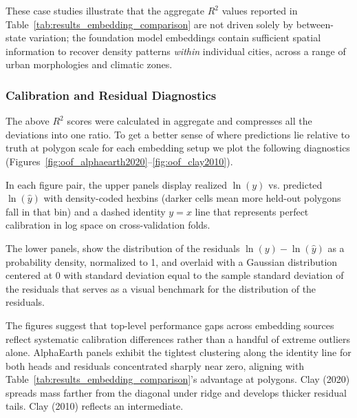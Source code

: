 \documentclass[12pt,letterpaper]{article}
\begin{document}
These case studies illustrate that the aggregate $R^2$ values reported in Table~\ref{tab:results_embedding_comparison} are not driven solely by between-state variation; the foundation model embeddings contain sufficient spatial information to recover density patterns \emph{within} individual cities, across a range of urban morphologies and climatic zones.

\subsubsection{Calibration and Residual Diagnostics}
\label{sub:calibration_diagnostics}

The above $R^2$ scores were calculated in aggregate and compresses all the deviations into one ratio. To get a better sense of where predictions lie relative to truth at polygon scale for each embedding setup we plot the following diagnostics (Figures~\ref{fig:oof_alphaearth2020}--\ref{fig:oof_clay2010}). 

In each figure pair, the upper panels display realized $\ln(y)$ vs. predicted $\ln(\hat{y})$ with density-coded hexbins (darker cells mean more held-out polygons fall in that bin) and a dashed identity $y=x$ line that represents perfect calibration in log space on cross-validation folds. 

The lower panels, show the distribution of the residuals $\ln(y) - \ln(\hat{y})$ as a probability density, normalized to 1, and overlaid with a Gaussian distribution centered at 0 with standard deviation equal to the sample standard deviation of the residuals that serves as a visual benchmark for the distribution of the residuals. 


The figures suggest that top-level performance gaps across embedding sources reflect systematic calibration differences rather than a handful of extreme outliers alone. AlphaEarth panels exhibit the tightest clustering along the identity line for both heads and residuals concentrated sharply near zero, aligning with Table~\ref{tab:results_embedding_comparison}'s advantage at polygons. Clay (2020) spreads mass farther from the diagonal under ridge and develops thicker residual tails. Clay (2010) reflects an intermediate.
\end{document}
